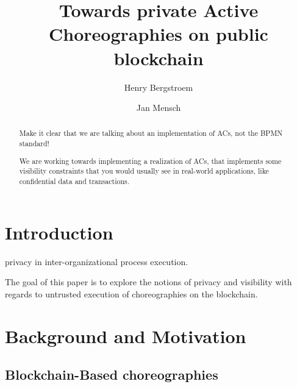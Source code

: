 \documentclass[runningheads]{llncs}
\begin{document}
%
\title{Towards private Active Choreographies on public blockchain}
%
%
\author{Henry Bergstroem \and
Jan Mensch}
%
%


%
\maketitle              %
%
\begin{abstract}

    Make it clear that we are talking about an implementation of ACs, not the BPMN standard!

    We are working towards implementing a realization of ACs, that implements some visibility constraints that you would usually see in real-world applications, like confidential data and transactions.

\end{abstract}

\section{Introduction} \label{sec:intro}

privacy in inter-organizational process execution.

The goal of this paper is to explore the notions of privacy and visibility with regards to untrusted execution of choreographies on the blockchain.



\section{Background and Motivation} \label{sec:backgrounmotivation}

\subsection{Blockchain-Based choreographies} \label{subsec:blockchainbased}
\end{document}
